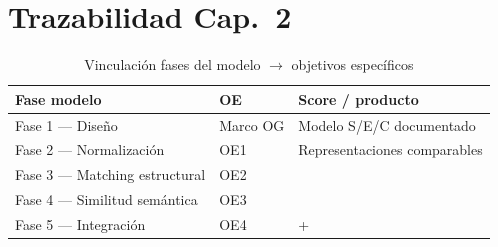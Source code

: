\small

\normalsize

\section{Trazabilidad Cap.~2}

\begin{table}[H]
  \centering
  \caption{Vinculación fases del modelo $\rightarrow$ objetivos específicos}
  \label{tab:anexo-c-trazabilidad}
  \small
  \begin{tabular}{@{}lll@{}}
    \toprule
    \textbf{Fase modelo} & \textbf{OE} & \textbf{Score / producto} \\
    \midrule
    Fase 1 — Diseño & Marco OG & Modelo S/E/C documentado \\
    Fase 2 — Normalización & OE1 & Representaciones comparables \\
    Fase 3 — Matching estructural & OE2 & \StructuralScore{} \\
    Fase 4 — Similitud semántica & OE3 & \SemanticScore{} \\
    Fase 5 — Integración & OE4 & \CoverageScore{} + \AlignmentScore{} \\
    \bottomrule
  \end{tabular}
\end{table}
